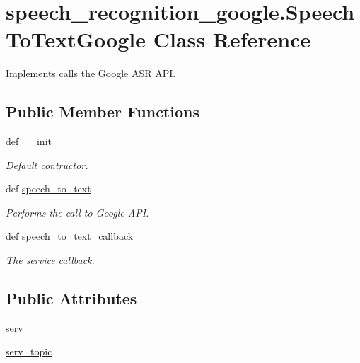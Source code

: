 \hypertarget{classspeech__recognition__google_1_1SpeechToTextGoogle}{\section{speech\-\_\-recognition\-\_\-google.\-Speech\-To\-Text\-Google Class Reference}
\label{classspeech__recognition__google_1_1SpeechToTextGoogle}
}


Implements calls the Google A\-S\-R A\-P\-I.  


\subsection*{Public Member Functions}
\begin{DoxyCompactItemize}
\item 
def \hyperlink{classspeech__recognition__google_1_1SpeechToTextGoogle_a9f605e951eb53e7c6c6d9f1c086a575e}{\-\_\-\-\_\-init\-\_\-\-\_\-}
\begin{DoxyCompactList}\small\item\em Default contructor. \end{DoxyCompactList}\item 
def \hyperlink{classspeech__recognition__google_1_1SpeechToTextGoogle_a2f1bb6ff3841c7507bd49c448bb1fe1a}{speech\-\_\-to\-\_\-text}
\begin{DoxyCompactList}\small\item\em Performs the call to Google A\-P\-I. \end{DoxyCompactList}\item 
def \hyperlink{classspeech__recognition__google_1_1SpeechToTextGoogle_af098721d9a43ec59f04625fb1e3fbd95}{speech\-\_\-to\-\_\-text\-\_\-callback}
\begin{DoxyCompactList}\small\item\em The service callback. \end{DoxyCompactList}\end{DoxyCompactItemize}
\subsection*{Public Attributes}
\begin{DoxyCompactItemize}
\item 
\hyperlink{classspeech__recognition__google_1_1SpeechToTextGoogle_a94ebcefbc7bdfb0f53d1c8d91cebae1c}{serv}
\item 
\hyperlink{classspeech__recognition__google_1_1SpeechToTextGoogle_a706a8904bbb7ae3e7431250323b559d6}{serv\-\_\-topic}
\end{DoxyCompactItemize}


